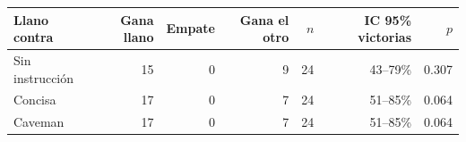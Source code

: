 \begin{tabular}{lrrrrrr}
\toprule
Llano contra & Gana llano & Empate & Gana el otro & $n$ & IC 95\% victorias & $p$ \\
\midrule
Sin instrucción & 15 & 0 & 9 & 24 & 43--79\% & 0.307 \\
Concisa & 17 & 0 & 7 & 24 & 51--85\% & 0.064 \\
Caveman & 17 & 0 & 7 & 24 & 51--85\% & 0.064 \\
\bottomrule
\end{tabular}
